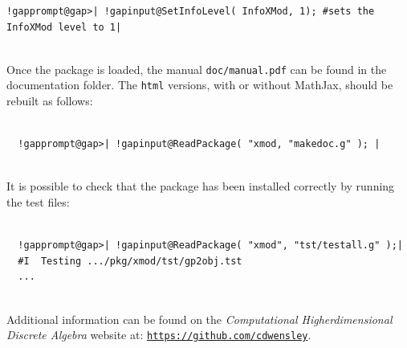 \documentclass[a4paper,11pt]{report}
\begin{document}
{\begin{Verbatim}[commandchars=!@|,fontsize=\small,frame=single,label=Example]
  !gapprompt@gap>| !gapinput@SetInfoLevel( InfoXMod, 1); #sets the InfoXMod level to 1|
  
\end{Verbatim}
 

 Once the package is loaded, the manual \texttt{doc/manual.pdf} can be found in the documentation folder. The \texttt{html} versions, with or without MathJax, should be rebuilt as follows: 

 
\begin{Verbatim}[commandchars=!@|,fontsize=\small,frame=single,label=Example]
  
  !gapprompt@gap>| !gapinput@ReadPackage( "xmod, "makedoc.g" ); |
  
\end{Verbatim}
 

 It is possible to check that the package has been installed correctly by
running the test files: 

 
\begin{Verbatim}[commandchars=!@|,fontsize=\small,frame=single,label=Example]
  
  !gapprompt@gap>| !gapinput@ReadPackage( "xmod", "tst/testall.g" );|
  #I  Testing .../pkg/xmod/tst/gp2obj.tst 
  ... 
  
\end{Verbatim}
 

 Additional information can be found on the \emph{Computational Higher\texttt{}dimensional Discrete Algebra} website at: \href{https://github.com/cdwensley} {\texttt{https://github.com/cdwensley}}. }

         
\end{document}
